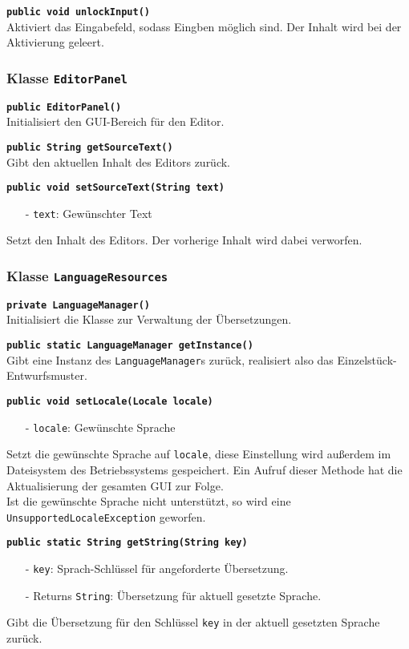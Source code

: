 \documentclass[parskip=full,11pt,twoside]{scrartcl}
\begin{document}
\textbf{\texttt{public void unlockInput()}}\\
Aktiviert das Eingabefeld, sodass Eingben möglich sind. Der Inhalt wird bei der Aktivierung geleert.

\subsubsection{Klasse \texttt{EditorPanel}}

\textbf{\texttt{public EditorPanel()}}\\
Initialisiert den GUI-Bereich für den Editor.

\textbf{\texttt{public String getSourceText()}}\\
Gibt den aktuellen Inhalt des Editors zurück.

\textbf{\texttt{public void setSourceText(String text)}}
\begin{itemize}[noitemsep]
	\item[-] \texttt{text}: Gewünschter Text
\end{itemize}
Setzt den Inhalt des Editors. Der vorherige Inhalt wird dabei verworfen.

\subsubsection{Klasse \texttt{LanguageResources}}

\textbf{\texttt{private LanguageManager()}}\\
Initialisiert die Klasse zur Verwaltung der Übersetzungen.

\textbf{\texttt{public static LanguageManager getInstance()}}\\
Gibt eine Instanz des \texttt{LanguageManager}s zurück, realisiert also das Einzelstück-Entwurfsmuster.

\textbf{\texttt{public void setLocale(Locale locale)}}
\begin{itemize}[noitemsep]
	\item[-] \texttt{locale}: Gewünschte Sprache
\end{itemize}
Setzt die gewünschte Sprache auf \texttt{locale}, diese Einstellung wird außerdem im Dateisystem des Betriebssystems gespeichert. Ein Aufruf dieser Methode hat die Aktualisierung der gesamten GUI zur Folge.\\
Ist die gewünschte Sprache nicht unterstützt, so wird eine \texttt{UnsupportedLocaleException} geworfen.

\textbf{\texttt{public static String getString(String key)}}
\begin{itemize}[noitemsep]
	\item[-] \texttt{key}: Sprach-Schlüssel für angeforderte Übersetzung.
	\item[-] Returns \texttt{String}: Übersetzung für aktuell gesetzte Sprache.
\end{itemize}
Gibt die Übersetzung für den Schlüssel \texttt{key} in der aktuell gesetzten Sprache zurück.
\end{document}
